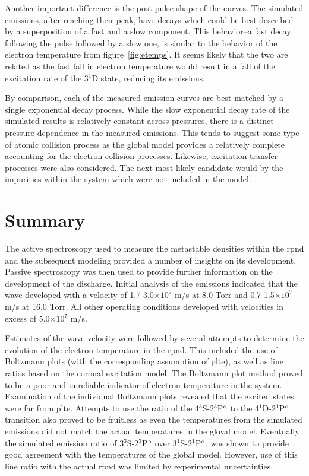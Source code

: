 Another important difference is the post-pulse shape of the curves. The
simulated emissions, after reaching their peak, have decays which could be best
described by a superposition of a fast and a slow component. This behavior--a
fast decay following the pulse followed by a slow one, is similar to the
behavior of the electron temperature from figure~\ref{fig:etemps}. It seems
likely that the two are related as the fast fall in electron temperature would
result in a fall of the excitation rate of the 3$^1$D state, reducing its
emissions.

By comparison, each of the measured emission curves are best matched by a single
exponential decay process. While the slow exponential decay rate of the
simulated results is relatively constant across pressures, there is a distinct
pressure dependence in the measured emissions. This tends to suggest some type
of atomic collision process as the global model provides a relatively complete
accounting for the electron collision processes. Likewise, excitation transfer
processes were also considered. The next most likely candidate would by the
impurities within the system which were not included in the model. 

\section{Summary}

The active spectroscopy used to measure the metastable densities within the
\acs{rpnd} and the subsequent modeling provided a number of insights on its
development. Passive spectroscopy was then used to provide further information
on the development of the discharge. Initial analysis of the emissions indicated
that the wave developed with a velocity of 1.7-3.0$\times10^7$ m/s at 8.0 Torr
and 0.7-1.5$\times10^7$ m/s at 16.0 Torr. All other operating conditions
developed with velocities in excess of 5.0$\times10^7$ m/s.

Estimates of the wave velocity were followed by several attempts to determine
the evolution of the electron temperature in the \acs{rpnd}. This included the
use of Boltzmann plots (with the corresponding assumption of \acs{plte}), as
well as line ratios based on the coronal excitation model. The Boltzmann plot
method proved to be a poor and unreliable indicator of electron temperature in
the system. Examination of the individual Boltzmann plots revealed that the
excited states were far from \acs{plte}. Attempts to use the ratio of the
4$^3$S-2$^3$P$^\mathrm{o}$ to the 4$^1$D-2$^1$P$^\mathrm{o}$ transition also proved to be
fruitless as even the temperatures from the simulated emissions did not match
the actual temperatures in the gloval model. Eventually the simulated emission
ratio of 3$^3$S-2$^3$P$^\mathrm{o}$ over 3$^1$S-2$^1$P$^\mathrm{o}$, was shown to provide good
agreement with the temperatures of the global model. However, use of this line
ratio with the actual \acs{rpnd} was limited by experimental uncertainties.


